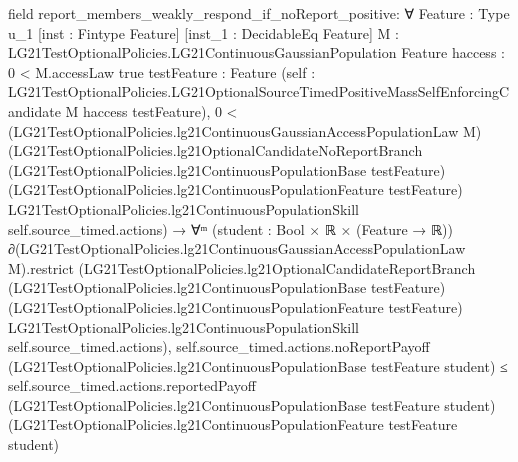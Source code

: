 \documentclass[10pt]{article}
\begin{document}
\begin{ReviewVerbatim}
field report_members_weakly_respond_if_noReport_positive:
∀ {Feature : Type u_1} [inst : Fintype Feature] [inst_1 : DecidableEq Feature]
  {M : LG21TestOptionalPolicies.LG21ContinuousGaussianPopulation Feature} {haccess : 0 < M.accessLaw {true}}
  {testFeature : Feature}
  (self : LG21TestOptionalPolicies.LG21OptionalSourceTimedPositiveMassSelfEnforcingCandidate M haccess testFeature),
  0 <
      (LG21TestOptionalPolicies.lg21ContinuousGaussianAccessPopulationLaw M)
        (LG21TestOptionalPolicies.lg21OptionalCandidateNoReportBranch
          (LG21TestOptionalPolicies.lg21ContinuousPopulationBase testFeature)
          (LG21TestOptionalPolicies.lg21ContinuousPopulationFeature testFeature)
          LG21TestOptionalPolicies.lg21ContinuousPopulationSkill self.source_timed.actions) →
    ∀ᵐ (student :
      Bool ×
        ℝ ×
          (Feature →
            ℝ)) ∂(LG21TestOptionalPolicies.lg21ContinuousGaussianAccessPopulationLaw M).restrict
        (LG21TestOptionalPolicies.lg21OptionalCandidateReportBranch
          (LG21TestOptionalPolicies.lg21ContinuousPopulationBase testFeature)
          (LG21TestOptionalPolicies.lg21ContinuousPopulationFeature testFeature)
          LG21TestOptionalPolicies.lg21ContinuousPopulationSkill self.source_timed.actions),
      self.source_timed.actions.noReportPayoff
          (LG21TestOptionalPolicies.lg21ContinuousPopulationBase testFeature student) ≤
        self.source_timed.actions.reportedPayoff
          (LG21TestOptionalPolicies.lg21ContinuousPopulationBase testFeature student)
          (LG21TestOptionalPolicies.lg21ContinuousPopulationFeature testFeature student)


\end{ReviewVerbatim}
\end{document}
